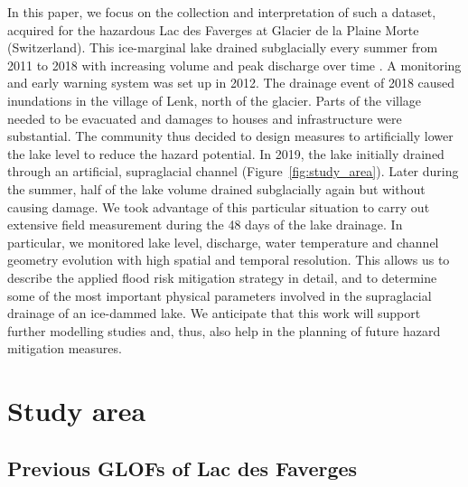 In this paper, we focus on the collection and interpretation of such a dataset, acquired for the hazardous Lac des Faverges at Glacier de la Plaine Morte (Switzerland). This ice-marginal lake drained subglacially every summer from 2011 to 2018 with increasing volume and peak discharge over time \citep{Huss&al2013b,Lindner&al2020}. A monitoring and early warning system was set up in 2012. The drainage event of 2018 caused inundations in the village of Lenk, north of the glacier. Parts of the village needed to be evacuated and damages to houses and infrastructure were substantial. The community thus decided to design measures to artificially lower the lake level to reduce the hazard potential. In 2019, the lake initially drained through an artificial, supraglacial channel  (Figure~\ref{fig:study_area}). Later during the summer, half of the lake volume drained subglacially again but without causing damage. We took advantage of this particular situation to carry out extensive field measurement during the 48 days of the lake drainage. In particular, we monitored lake level, discharge, water temperature and channel geometry evolution with high spatial and temporal resolution. This allows us to describe the applied flood risk mitigation strategy in detail, and to determine some of the most important physical parameters involved in the supraglacial drainage of an ice-dammed lake. We anticipate that this work will support further modelling studies and, thus, also help in the planning of future hazard mitigation measures.


\section{Study area}

\subsection{Previous GLOFs of Lac des Faverges}

